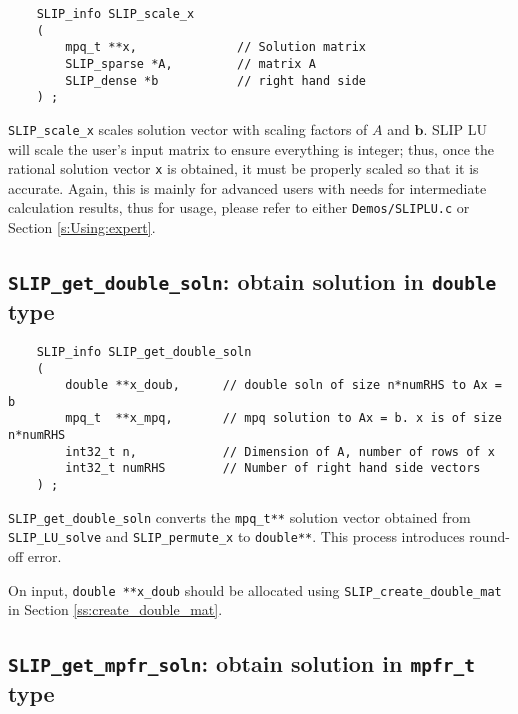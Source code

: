\documentclass[12pt]{article}
\theoremstyle{definition}
\begin{document}
\begin{mdframed}[userdefinedwidth=6in]
{\footnotesize
\begin{verbatim}
    SLIP_info SLIP_scale_x
    (
        mpq_t **x,              // Solution matrix
        SLIP_sparse *A,         // matrix A
        SLIP_dense *b           // right hand side
    ) ;
\end{verbatim}
} \end{mdframed}

\verb|SLIP_scale_x| scales solution vector with scaling factors of $A$ and
$\mathbf{b}$. SLIP LU will scale the user's input matrix to ensure everything
is integer; thus, once the rational solution vector \verb|x| is obtained, it
must be properly scaled so that it is accurate. Again, this is mainly for
advanced users with needs for intermediate calculation results, thus for usage,
please refer to either \verb|Demos/SLIPLU.c| or Section \ref{s:Using:expert}.

\cprotect\subsection{\verb|SLIP_get_double_soln|: obtain solution in \verb|double| type}
\label{ss:get_double_soln}

\begin{mdframed}[userdefinedwidth=6in]
{\footnotesize
\begin{verbatim}
    SLIP_info SLIP_get_double_soln
    (
        double **x_doub,      // double soln of size n*numRHS to Ax = b
        mpq_t  **x_mpq,       // mpq solution to Ax = b. x is of size n*numRHS
        int32_t n,            // Dimension of A, number of rows of x
        int32_t numRHS        // Number of right hand side vectors
    ) ;
\end{verbatim}
} \end{mdframed}

\verb|SLIP_get_double_soln| converts the \verb|mpq_t**| solution vector
obtained from \verb|SLIP_LU_solve| and \verb|SLIP_permute_x| to
\verb|double**|. This process introduces round-off error.

On input, \verb|double **x_doub| should be allocated using
\verb|SLIP_create_double_mat| in Section \ref{ss:create_double_mat}.

\cprotect\subsection{\verb|SLIP_get_mpfr_soln|: obtain solution in \verb|mpfr_t| type}
\label{ss:get_mpfr_soln}
\end{document}
